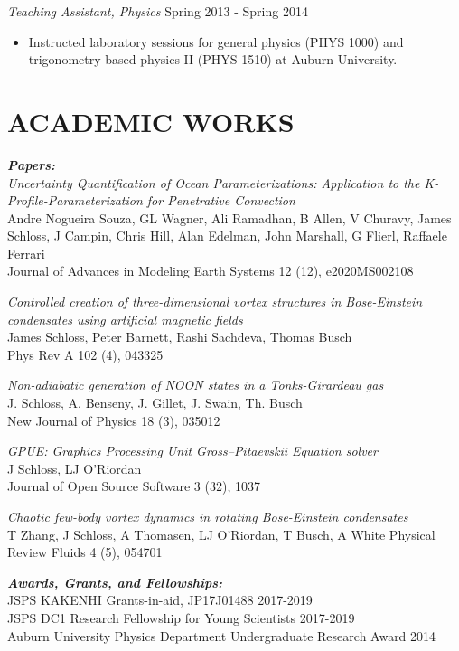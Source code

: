 \documentclass[margin, 10pt, a4paper]{res} %
\begin{document}
\begin{resume}
{\sl Teaching Assistant, Physics} \hfill Spring 2013 - Spring 2014 
\begin{itemize}[label = {}]
\item Instructed laboratory sessions for general physics (PHYS 1000) and trigonometry-based physics II (PHYS 1510) at Auburn University.
\end{itemize} 

\section{ACADEMIC WORKS}

{\sl \textbf{Papers:} } \\
  
  \textit{Uncertainty Quantification of Ocean Parameterizations: Application to the K-Profile-Parameterization for Penetrative Convection} \\
  Andre Nogueira Souza, GL Wagner, Ali Ramadhan, B Allen, V Churavy, James Schloss, J Campin, Chris Hill, Alan Edelman, John Marshall, G Flierl, Raffaele Ferrari \\
  Journal of Advances in Modeling Earth Systems 12 (12), e2020MS002108
  
  \textit{Controlled creation of three-dimensional vortex structures in Bose-Einstein condensates using artificial magnetic fields} \\
  James Schloss, Peter Barnett, Rashi Sachdeva, Thomas Busch \\
  Phys Rev A 102 (4), 043325
  
 \textit{Non-adiabatic generation of NOON states in a Tonks-Girardeau gas} \\
  J. Schloss, A. Benseny, J. Gillet, J. Swain, Th. Busch \\
  New Journal of Physics 18 (3), 035012
  
  \textit{GPUE: Graphics Processing Unit Gross--Pitaevskii Equation solver} \\
  J Schloss, LJ O'Riordan \\
  Journal of Open Source Software 3 (32), 1037
  
  \textit{Chaotic few-body vortex dynamics in rotating Bose-Einstein condensates} \\
  T Zhang, J Schloss, A Thomasen, LJ O'Riordan, T Busch, A White
  Physical Review Fluids 4 (5), 054701
 
 {\sl \textbf{Awards, Grants, and Fellowships:}} \\
 JSPS KAKENHI Grants-in-aid, JP17J01488 \hfill 2017-2019 \\
 JSPS DC1 Research Fellowship for Young Scientists \hfill 2017-2019\\
 Auburn University Physics Department Undergraduate Research Award \hfill 2014


\end{resume}
\end{document}
